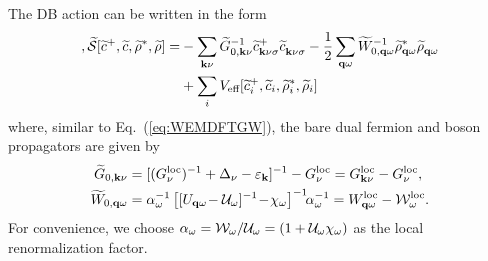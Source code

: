 \documentclass[rmp,aps,reprint,amsmath,amssymb,superscriptaddress,showpacs,nofootinbib]{revtex4-1}
\newcommand{\kv}{\ensuremath{\mathbf{k}}}
\newcommand{\qv}{\ensuremath{\mathbf{q}}}
\begin{document}
The DB action can be written in the form
\begin{align}
\label{Eq:DBaction},
  \widetilde{\mathcal{S}}[\widetilde{c}^+,\widetilde{c},\widetilde{\rho}^*,\widetilde{\rho}] =&
  -\sum_{\mathbf{k}\nu} \widetilde{G}_{0,\mathbf{k}\nu}^{-1} \widetilde{c}^+_{\mathbf{k}\nu\sigma} \widetilde{c}^{\phantom{+}}_{\mathbf{k}\nu\sigma} - \frac{1}{2}\sum_{\mathbf{q}\omega} \widetilde{W}_{0,\mathbf{q}\omega}^{-1} \widetilde{\rho}^{*}_{\mathbf{q}\omega} \widetilde{\rho}^{\phantom{*}}_{\mathbf{q}\omega}\notag\\&+ \sum_{i}V_{\text{eff}}[\widetilde{c}^+_{i},\widetilde{c}_{i},\widetilde{\rho}^*_{i},\widetilde{\rho}_{i}]
\end{align}
where, similar to Eq.~(\ref{eq:WEMDFTGW}), the bare dual fermion and boson propagators are given by
\begin{align}
\label{eq:tildeG0}
  \widetilde{G}_{0,\kv\nu} &= [(G^{\text{loc}}_{\nu})^{-1}+\Delta_{\nu}-\varepsilon_{\bf k}]^{-1} - G^{\text{loc}}_{\nu} = G^{\rm loc}_{\kv\nu} - G^{\text{loc}}_{\nu} ,
\\ \label{eq:tildeW0}
  \widetilde{W}_{0,\qv\omega} &= \alpha_{\omega}^{-1}\left[[U_{\bf q\omega}\!-{\cal U}_{\omega}]^{-1} \!-\! \chi_{\omega}\right]^{-1}\!\!\alpha_{\omega}^{-1} = W^{\rm loc}_{\qv\omega} -{\cal W}^{\text{loc}}_{\omega}.
\end{align}
For convenience, we choose $\alpha_{\omega}={\cal W}_{\omega}/{\cal U}_{\omega}=(1+{\cal U}_{\omega}\chi_{\omega})$  as the local renormalization factor.
\end{document}
